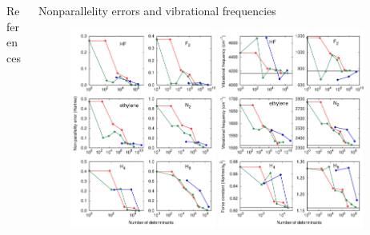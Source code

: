 \documentclass[final]{beamer}
\newlength{\colwidth}
\begin{document}
\begin{frame}[t]
\begin{columns}[t]
\begin{column}{\colwidth}
\vspace{-1.5cm}
\begin{block}{References}
  \vspace{-0.5cm}
  \printbibliography
\end{block}

\end{column}


\begin{column}{\colwidth}

\vspace{-1.5cm}
\begin{block}{Nonparallelity errors and vibrational frequencies}
  \vspace{-0.5cm}
  \begin{figure}
    \includegraphics[width=0.47\textwidth]{fig/plot_stat.pdf}
    \includegraphics[width=0.47\textwidth]{fig/freq.pdf}

\end{figure}
\end{block}
\end{column}
\end{columns}
\end{frame}
\end{document}
